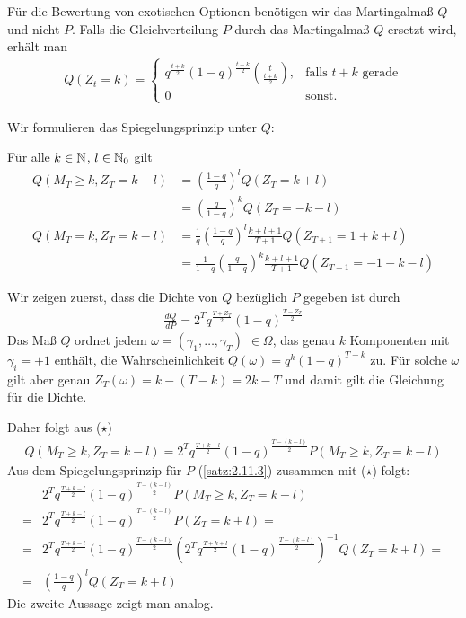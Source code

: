 \documentclass[a4paper,twoside,DIV15,BCOR12mm]{scrbook}
\begin{document}
Für die Bewertung von exotischen Optionen benötigen wir das Martingalmaß $Q$ und nicht $P$. Falls die Gleichverteilung $P$ durch das Martingalmaß $Q$ ersetzt wird, erhält man
\begin{align*}
Q(Z_t = k ) =
\begin{cases}
q^{\frac{t+k}2} (1-q)^{\frac{t-k}2} \binom{t}{\frac{t+k}2}, &\text{falls $t+k$ gerade}\\
0 &\text{sonst.}
\end{cases}
\end{align*}

Wir formulieren das Spiegelungsprinzip unter $Q$:

\begin{satz}
\label{satz:2.11.4}
Für alle $k\in \mathbb{N}$, $l\in\mathbb{N}_0$ gilt
\begin{align*}
Q(M_T\ge k, Z_T=k-l)&=\left(\frac{1-q}{q}\right)^l Q(Z_T=k+l)  \\
&=\left(\frac{q}{1-q}\right)^k Q(Z_T=-k-l)\\
Q(M_T=k,Z_T=k-l)&=\frac{1}{q} \left(\frac{1-q}{q}\right)^l \frac{k+l+1}{T+1} Q(Z_{T+1}=1+k+l)\\
&=\frac{1}{1-q} \left(\frac{q}{1-q}\right)^k \frac{k+l+1}{T+1} Q(Z_{T+1}=-1-k-l)
\end{align*}
\end{satz}
\begin{beweis}
Wir zeigen zuerst, dass die Dichte von $Q$ bezüglich $P$ gegeben ist durch 
\begin{align*}
\frac{dQ}{dP}=2^T q^{\frac{T+Z_T}{2}}(1-q)^{\frac{T-Z_T}{2}} \tag{$\star$}
 \end{align*}
Das Maß $Q$ ordnet jedem $\omega=(\gamma_1,\ldots,\gamma_T)$ $\in\Omega$, das genau $k$ Komponenten mit $\gamma_i=+1$ enthält, die Wahrscheinlichkeit $Q(\omega)=q^k(1-q)^{T-k}$ zu. Für solche $\omega$ gilt aber genau $Z_T(\omega)=k-(T-k)=2k-T$ und damit gilt die Gleichung für die Dichte.

Daher folgt aus ($\star$) 
\begin{align*}
Q(M_T\ge k,Z_T=k-l)=2^T q^{\frac{T+k-l}{2}}(1-q)^{\frac{T-(k-l)}{2}}P(M_T\ge k,Z_T=k-l)
\end{align*} 
Aus dem Spiegelungsprinzip für $P$ (\ref{satz:2.11.3}) zusammen mit ($\star$) folgt:
\begin{align*}
&2^T q^{\frac{T+k-l}{2}}(1-q)^{\frac{T-(k-l)}{2}}P(M_T\ge k,Z_T=k-l)\\
=& 2^T q^{\frac{T+k-l}{2}}(1-q)^{\frac{T-(k-l)}{2}}P(Z_T=k+l)=\\
=&2^T q^{\frac{T+k-l}{2}}(1-q)^{\frac{T-(k-l)}{2}}(2^T q^{\frac{T+k+l}{2}}(1-q)^{\frac{T-(k+l)}{2}})^{-1}Q(Z_T=k+l)=\\
=&\left(\frac{1-q}{q}\right)^l Q(Z_T=k+l)
\end{align*}
Die zweite Aussage zeigt man analog.
\end{beweis}
\end{document}
